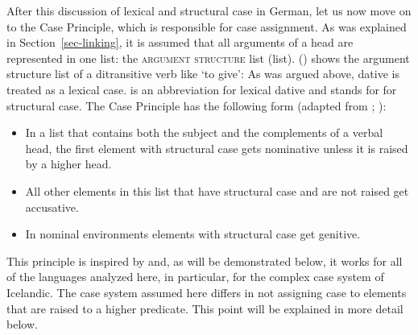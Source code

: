 








After this discussion of lexical and structural case in German, let us now move on to the Case Principle,
which is responsible for case assignment. As was explained in Section~\ref{sec-linking}, it is assumed that all arguments of a
head are represented in one list: the \textsc{argument structure} list (\argst list). 
() shows the argument structure list of a ditransitive verb like  `to give':
\ea
{}
\z
As was argued above, dative is treated as a lexical case.  is an abbreviation for lexical
dative and  stands for for structural case. The Case
Principle has the following form (adapted from \citealp{Prze99}; \citealp{Meurers99b}):

\begin{principle-break}
\label{case-p}
\begin{itemize}
\item In a list that contains both the subject and the complements of a verbal head, the first
  element with structural case gets nominative unless it is raised by a higher head.
\item All other elements in this list that have structural case and are not raised get accusative.
\item In nominal environments elements with structural case get genitive.
\end{itemize}
\end{principle-break}
This principle is inspired by \citet*{YMJ87} and, as will be demonstrated below, it works for all of
the languages analyzed here, in particular, for the complex case system of Icelandic. The case
system assumed here differs in not assigning case to elements that are raised
to a higher predicate. This point will be explained in more detail below.

